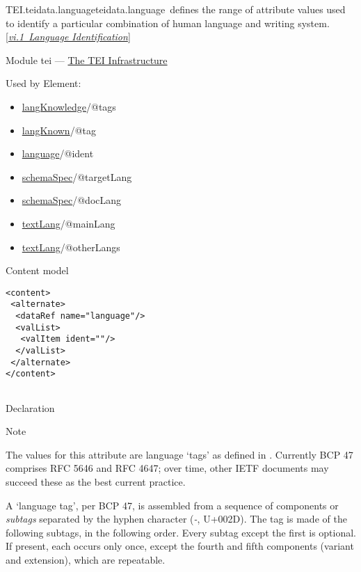 \begin{reflist}
\item[]\begin{specHead}{TEI.teidata.language}{teidata.language} defines the range of attribute values used to identify a particular combination of human language and writing system. [\textit{\hyperref[CHSH]{vi.1\ Language Identification}}]\end{specHead} 
    \item[{Module}]
  tei — \hyperref[ST]{The TEI Infrastructure}
    \item[{Used by}]
  Element: \begin{itemize}
\item \hyperref[TEI.langKnowledge]{langKnowledge}/@tags
\item \hyperref[TEI.langKnown]{langKnown}/@tag
\item \hyperref[TEI.language]{language}/@ident
\item \hyperref[TEI.schemaSpec]{schemaSpec}/@targetLang
\item \hyperref[TEI.schemaSpec]{schemaSpec}/@docLang
\item \hyperref[TEI.textLang]{textLang}/@mainLang
\item \hyperref[TEI.textLang]{textLang}/@otherLangs
\end{itemize} 
    \item[{Content model}]
  \mbox{}\hfill\\[-10pt]\begin{Verbatim}[fontsize=\small]
<content>
 <alternate>
  <dataRef name="language"/>
  <valList>
   <valItem ident=""/>
  </valList>
 </alternate>
</content>
    
\end{Verbatim}

    \item[{Declaration}]
    \item[{Note}]
  \par
The values for this attribute are language ‘tags’ as defined in . Currently BCP 47 comprises RFC 5646 and RFC 4647; over time, other IETF documents may succeed these as the best current practice.\par
A ‘language tag’, per BCP 47, is assembled from a sequence of components or \textit{subtags} separated by the hyphen character (\textit{-}, U+002D). The tag is made of the following subtags, in the following order. Every subtag except the first is optional. If present, each occurs only once, except the fourth and fifth components (variant and extension), which are repeatable. \begin{description}


\end{description}
\end{reflist}

